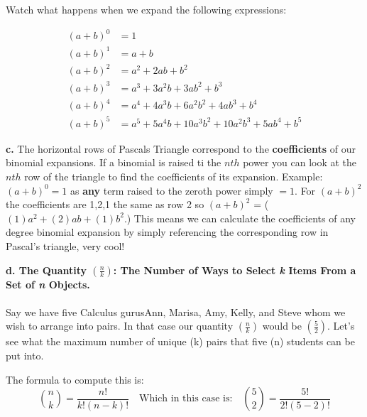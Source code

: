 \documentclass{article}
\begin{document}
{ Watch what happens when we expand the following expressions:}
 
\begin{align*}
  (a + b)^0 &= 1\\
  (a + b)^1 &= a + b\\
  (a + b)^2 &= a^2 + 2ab + b^2\\
  (a + b)^3 &= a^3 + 3a^2b + 3ab^2 + b^3\\
  (a + b)^4 &= a^4 + 4a^3 b + 6a^2b^2 + 4ab^3 + b^4\\
  (a + b)^5 &= a^5 + 5a^4 b + 10a^3 b^2 + 10a^2 b^3 + 5ab^4+b^5
\end{align*} 

\vspace{3mm}
 
{\bfseries c.} The horizontal rows of Pascals Triangle correspond to the {\bfseries coefficients} of our binomial expansions. If a binomial is raised ti the $nth$ power you can look at the $nth$ row of the triangle to find the coefficients of its expansion. Example: $(a+b)^0 = 1$ as {\bfseries any} term raised to the zeroth power simply $=1$. For $(a+b)^2$ the coefficients are 1,2,1 the same as row 2 so  $(a+b)^2$ = ($(1) a^2+(2) ab+(1) b^2$.)
This means we can calculate the coefficients of any degree binomial expansion by simply referencing the corresponding row in Pascal's triangle, very cool! \\

\pagebreak   

\vspace{8 mm}

 {\bfseries d. The Quantity $(\frac{n}{k})$: The Number of Ways to Select {\emph k} Items From a Set of {\emph n} Objects.}\\
%
\vspace{4 mm}\\Say we have five Calculus gurus\textemdash Ann, Marisa, Amy, Kelly, and Steve whom we wish to arrange into pairs. In that case our quantity  $(\frac{n}{k})$ would be $(\frac{5}{2}).$
Let's see what the maximum number of unique (k) pairs that five (n) students can be put into.\\
\vspace{3 mm}

The formula to compute this is: 
\vspace{3 mm}
\[
 \binom{n}{k}=\frac{n!}{k!(n-k)!} \quad \text {Which in this case is:}  \quad \binom{5}{2}=\frac{5!}{2!(5-2)!}
\]
\vspace{3 mm}
\end{document}
